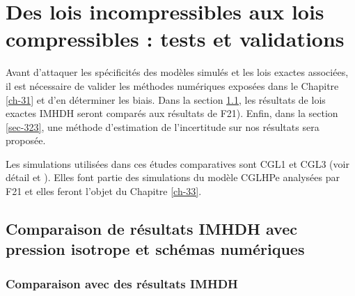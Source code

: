 \chapter{Des lois incompressibles aux lois compressibles : tests et validations }
\renewcommand\partie{\Partie\ Chapitre \thechapter}
\label{ch-32}

\minitoc  

 Avant d'attaquer les spécificités des modèles simulés et les lois exactes associées, il est nécessaire de valider les méthodes numériques exposées dans le Chapitre \ref{ch-31} et d'en déterminer les biais. Dans la section \ref{sec-321}, les résultats de lois exactes \acs{IMHDH} seront comparés aux résultats de \ac{F21}). %
 Enfin, dans la section \ref{sec-323}, une méthode d'estimation de l'incertitude sur nos résultats sera proposée. 

 Les simulations utilisées dans ces études comparatives sont CGL1 et CGL3 (voir détail  et ). Elles font partie des simulations du modèle \acs{CGLHPe} analysées par \ac{F21} et elles feront l'objet du Chapitre \ref{ch-33}.  

  
 

 
\section{Comparaison de résultats \acs{IMHDH} avec pression isotrope et schémas numériques}
\label{sec-321}

\subsection{Comparaison avec des  résultats \acs{IMHDH}}

